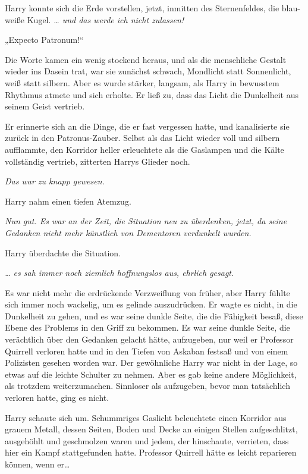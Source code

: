 {Harry konnte sich die Erde vorstellen, jetzt, inmitten des Sternenfeldes, die blau-weiße Kugel. \emph{… und das werde ich nicht zulassen!}

„Expecto Patronum!“

Die Worte kamen ein wenig stockend heraus, und als die menschliche Gestalt wieder ins Dasein trat, war sie zunächst schwach, Mondlicht statt Sonnenlicht, weiß statt silbern. Aber es wurde stärker, langsam, als Harry in bewusstem Rhythmus atmete und sich erholte. Er ließ zu, dass das Licht die Dunkelheit aus seinem Geist vertrieb.

Er erinnerte sich an die Dinge, die er fast vergessen hatte, und kanalisierte sie zurück in den Patronus-Zauber. Selbst als das Licht wieder voll und silbern aufflammte, den Korridor heller erleuchtete als die Gaslampen und die Kälte vollständig vertrieb, zitterten Harrys Glieder noch.

\emph{Das war zu knapp gewesen.}

Harry nahm einen tiefen Atemzug.

\emph{Nun gut. Es war an der Zeit, die Situation neu zu überdenken, jetzt, da seine Gedanken nicht mehr künstlich von Dementoren verdunkelt wurden.}

Harry überdachte die Situation.

\emph{… es sah immer noch ziemlich hoffnungslos aus, ehrlich gesagt}.

Es war nicht mehr die erdrückende Verzweiflung von früher, aber Harry fühlte sich immer noch wackelig, um es gelinde auszudrücken. Er wagte es nicht, in die Dunkelheit zu gehen, und es war seine dunkle Seite, die die Fähigkeit besaß, diese Ebene des Problems in den Griff zu bekommen. Es war seine dunkle Seite, die verächtlich über den Gedanken gelacht hätte, aufzugeben, nur weil er Professor Quirrell verloren hatte und in den Tiefen von Askaban festsaß und von einem Polizisten gesehen worden war. Der gewöhnliche Harry war nicht in der Lage, so etwas auf die leichte Schulter zu nehmen. Aber es gab keine andere Möglichkeit, als trotzdem weiterzumachen. Sinnloser als aufzugeben, bevor man tatsächlich verloren hatte, ging es nicht.

Harry schaute sich um. Schummriges Gaslicht beleuchtete einen Korridor aus grauem Metall, dessen Seiten, Boden und Decke an einigen Stellen aufgeschlitzt, ausgehöhlt und geschmolzen waren und jedem, der hinschaute, verrieten, dass hier ein Kampf stattgefunden hatte. Professor Quirrell hätte es leicht reparieren können, wenn er…

}
